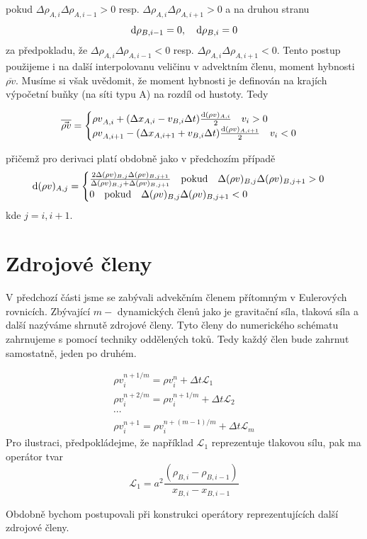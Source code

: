 pokud $\Delta\rho_{A,i}\Delta{\rho_{A,i-1}} > 0$ resp. $\Delta\rho_{A,i}\Delta{\rho_{A,i+1}} > 0$ a na druhou stranu
\begin{equation}
{\rm d}\rho_{B,i-1} = 0, \quad {\rm d}\rho_{B,i} = 0
\end{equation}
 za předpokladu, že $\Delta\rho_{A,i}\Delta{\rho_{A,i-1}} < 0$ resp. $\Delta\rho_{A,i}\Delta{\rho_{A,i+1}} < 0$.
Tento postup použijeme i na další interpolovanu veličinu v advektním členu, moment hybnosti $\overline{\rho v}$. Musíme si však uvědomit, že moment hybnosti je definován na krajích výpočetní buňky (na síti typu A) na rozdíl od hustoty. Tedy
\begin{tcolorbox}[title= Advekce momentu hybnosti - VanLeer schéma]
\begin{equation}
\overline{\vec{\rho v}} =
\begin{cases}
{\rho v}_{A,i}+(\Delta x_{A,i}-v_{B,i}\Delta t)\frac{{\rm d}(\rho v)_{A,i}}{2} \quad v_i > 0 \\
{\rho v}_{A,i+1}-(\Delta x_{A,i+1}+v_{B,i}\Delta t)\frac{{\rm d}(\rho v)_{A,i+1}}{2} \quad v_{i} < 0
\end{cases}
\end{equation}
\end{tcolorbox}
přičemž pro derivaci platí obdobně jako v předchozím případě
\begin{equation}
{\rm d}(\rho v)_{A,j} = 
\begin{cases}
\frac{{2}{\Delta (\rho v)_{B,j} \Delta (\rho v)_{B,j+1}}}{\Delta (\rho v)_{B,j}
+\Delta (\rho v)_{B,j+1}} \quad \text{pokud} \quad {\Delta (\rho v)_{B,j} \Delta (\rho v)_{B,j+1}} > 0 \\
0  \quad \text{pokud} \quad {\Delta (\rho v)_{B,j} \Delta (\rho v)_{B,j+1}} < 0
\end{cases}
\end{equation}
kde $j = {i,i+1}$.
\section{Zdrojové členy}
V předchozí části jsme se zabývali advekčním členem přítomným v Eulerových rovnicích. Zbývající $m-$ dynamických členů jako je gravitační síla, tlaková síla a další nazýváme shrnutě zdrojové členy. Tyto členy do numerického schématu zahrnujeme s pomocí techniky oddělených toků. Tedy každý člen bude zahrnut samostatně, jeden po druhém.
\begin{tcolorbox}[title=Zdrojové členy]
\begin{eqnarray}
{\rho v}_i^{n+1/m} ={\rho v}_i^{n}+\Delta t \mathcal{L}_1\\
{\rho v}_i^{n+2/m} ={\rho v}_i^{n+1/m}+\Delta t \mathcal{L}_2 \\
\nonumber \cdots \\
{\rho v}_i^{n+1} = {\rho v}_i^{n+(m-1)/m}+\Delta t \mathcal{L}_m
\end{eqnarray} 
Pro ilustraci, předpokládejme, že například $\mathcal{L}_1$ reprezentuje tlakovou sílu, pak ma operátor tvar
\begin{equation}
\mathcal{L}_1 = a^2 \frac{(\rho_{B,i}-\rho_{B,i-1})}{x_{B,i}-x_{B,i-1}}
\end{equation}
\end{tcolorbox}
Obdobně bychom postupovali při konstrukci operátory reprezentujících další zdrojové členy.
